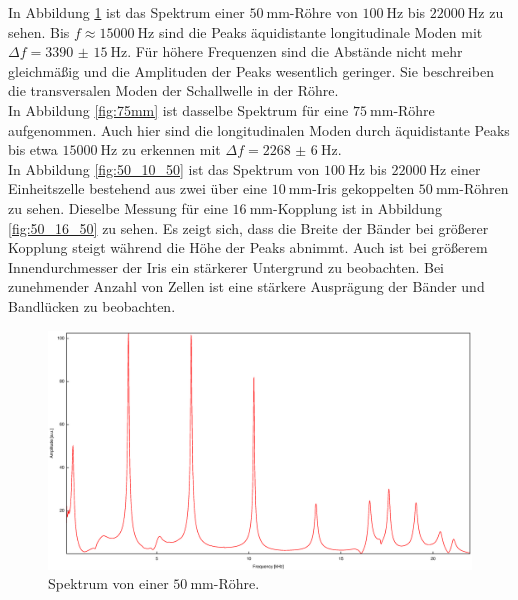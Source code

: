In Abbildung \ref{fig:50mm} ist das Spektrum einer $\SI{50}{\milli\meter}$-Röhre von $\SI{100}{\hertz}$ bis $\SI{22000}{\hertz}$ zu sehen. Bis $f\approx\SI{15000}{\hertz}$
sind die Peaks äquidistante longitudinale Moden mit $\Delta f=\SI{3390(15)}{\hertz}$. Für höhere Frequenzen sind die Abstände nicht mehr gleichmäßig und die Amplituden der Peaks wesentlich geringer. Sie beschreiben die transversalen Moden der Schallwelle in der Röhre.\\
In Abbildung \ref{fig:75mm} ist dasselbe Spektrum für eine $\SI{75}{\milli\meter}$-Röhre aufgenommen. Auch hier sind die longitudinalen Moden durch äquidistante Peaks bis etwa $\SI{15000}{\hertz}$ zu erkennen mit $\Delta f=\SI{2268(6)}{\hertz}$.\\
In Abbildung \ref{fig:50_10_50} ist das Spektrum von $\SI{100}{\hertz}$ bis $\SI{22000}{\hertz}$ einer Einheitszelle bestehend aus zwei über eine $\SI{10}{\milli\meter}$-Iris gekoppelten $\SI{50}{\milli\meter}$-Röhren zu sehen. Dieselbe Messung für eine $\SI{16}{\milli\meter}$-Kopplung ist in Abbildung \ref{fig:50_16_50} zu sehen. Es zeigt sich, dass die Breite der Bänder bei größerer Kopplung steigt während die Höhe der Peaks abnimmt. Auch ist bei größerem Innendurchmesser der Iris ein stärkerer Untergrund zu beobachten.
Bei zunehmender Anzahl von Zellen ist eine stärkere Ausprägung der Bänder und Bandlücken zu beobachten.

\begin{figure}
\centering
\includegraphics[width=\linewidth-60pt,height=\textheight-60pt,keepaspectratio]{FP-V23data/4.6_50mm.eps}
\caption{Spektrum von einer $\SI{50}{\milli\meter}$-Röhre.}
\label{fig:50mm}
\end{figure}

